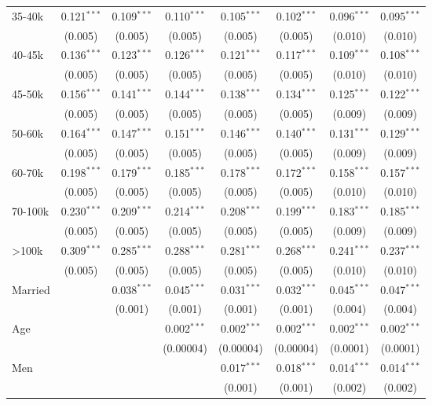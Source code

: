 \begin{table}[!htbp]
\begin{tabular}{@{\extracolsep{5pt}}lccccccc}
  35-40k & 0.121$^{***}$ & 0.109$^{***}$ & 0.110$^{***}$ & 0.105$^{***}$ & 0.102$^{***}$ & 0.096$^{***}$ & 0.095$^{***}$ \\ 
  & (0.005) & (0.005) & (0.005) & (0.005) & (0.005) & (0.010) & (0.010) \\ 
  40-45k & 0.136$^{***}$ & 0.123$^{***}$ & 0.126$^{***}$ & 0.121$^{***}$ & 0.117$^{***}$ & 0.109$^{***}$ & 0.108$^{***}$ \\ 
  & (0.005) & (0.005) & (0.005) & (0.005) & (0.005) & (0.010) & (0.010) \\ 
  45-50k & 0.156$^{***}$ & 0.141$^{***}$ & 0.144$^{***}$ & 0.138$^{***}$ & 0.134$^{***}$ & 0.125$^{***}$ & 0.122$^{***}$ \\ 
  & (0.005) & (0.005) & (0.005) & (0.005) & (0.005) & (0.009) & (0.009) \\ 
  50-60k & 0.164$^{***}$ & 0.147$^{***}$ & 0.151$^{***}$ & 0.146$^{***}$ & 0.140$^{***}$ & 0.131$^{***}$ & 0.129$^{***}$ \\ 
  & (0.005) & (0.005) & (0.005) & (0.005) & (0.005) & (0.009) & (0.009) \\ 
  60-70k & 0.198$^{***}$ & 0.179$^{***}$ & 0.185$^{***}$ & 0.178$^{***}$ & 0.172$^{***}$ & 0.158$^{***}$ & 0.157$^{***}$ \\ 
  & (0.005) & (0.005) & (0.005) & (0.005) & (0.005) & (0.010) & (0.010) \\ 
  70-100k & 0.230$^{***}$ & 0.209$^{***}$ & 0.214$^{***}$ & 0.208$^{***}$ & 0.199$^{***}$ & 0.183$^{***}$ & 0.185$^{***}$ \\ 
  & (0.005) & (0.005) & (0.005) & (0.005) & (0.005) & (0.009) & (0.009) \\ 
  >100k & 0.309$^{***}$ & 0.285$^{***}$ & 0.288$^{***}$ & 0.281$^{***}$ & 0.268$^{***}$ & 0.241$^{***}$ & 0.237$^{***}$ \\ 
  & (0.005) & (0.005) & (0.005) & (0.005) & (0.005) & (0.010) & (0.010) \\ 
  Married &  & 0.038$^{***}$ & 0.045$^{***}$ & 0.031$^{***}$ & 0.032$^{***}$ & 0.045$^{***}$ & 0.047$^{***}$ \\ 
  &  & (0.001) & (0.001) & (0.001) & (0.001) & (0.004) & (0.004) \\ 
  Age &  &  & 0.002$^{***}$ & 0.002$^{***}$ & 0.002$^{***}$ & 0.002$^{***}$ & 0.002$^{***}$ \\ 
  &  &  & (0.00004) & (0.00004) & (0.00004) & (0.0001) & (0.0001) \\ 
  Men &  &  &  & 0.017$^{***}$ & 0.018$^{***}$ & 0.014$^{***}$ & 0.014$^{***}$ \\ 
  &  &  &  & (0.001) & (0.001) & (0.002) & (0.002) \\ 

\end{tabular}
\end{table}
